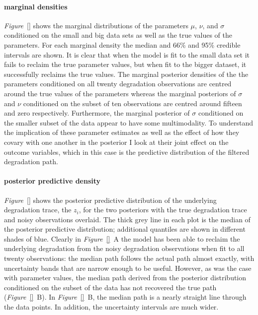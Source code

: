\paragraph*{marginal densities}
\textit{Figure}~\ref{} shows the marginal distributions of the parameters $\mu$, $\nu$, and $\sigma$ conditioned on the small and big data sets as well as the true values of the parameters. For each marginal density the median and 66\% and 95\% credible intervals are shown. It is clear that when the model is fit to the small data set it fails to reclaim the true parameter values, but when fit to the bigger dataset, it successfully reclaims the true values. The marginal posterior densities of the the parameters conditioned on all twenty degradation observations are centred around the true values of the parameters whereas the marginal posteriors of $\sigma$ and $\nu$ conditioned on the subset of ten observations are centred around fifteen and zero respectively. Furthermore, the marginal posterior of $\sigma$ conditioned on the smaller subset of the data appear to have some multimodality. To understand the implication of these parameter estimates as well as the effect of how they covary with one another in the posterior I look at their joint effect on the outcome variables, which in this case is the predictive distribution of the filtered degradation path.

\paragraph*{posterior predictive density}
\textit{Figure}~\ref{} shows the posterior predictive distribution of the underlying degradation trace, the $z_i$, for the two posteriors with the true degradation trace and noisy observations overlaid. The thick grey line in each plot is the median of the posterior predictive distribution; additional quantiles are shown in different shades of blue. Clearly in \textit{Figure}~\ref{}~A the model has been able to reclaim the underlying degradation from the noisy degradation observations when fit to all twenty observations: the median path follows the actual path almost exactly, with uncertainty bands that are narrow enough to be useful. However, as was the case with parameter values, the median path derived from the posterior distribution conditioned on the subset of the data has not recovered the true path (\textit{Figure}~\ref{}~B). In \textit{Figure}~\ref{}~B, the median path is a nearly straight line through the data points. In addition, the uncertainty intervals are much wider.

